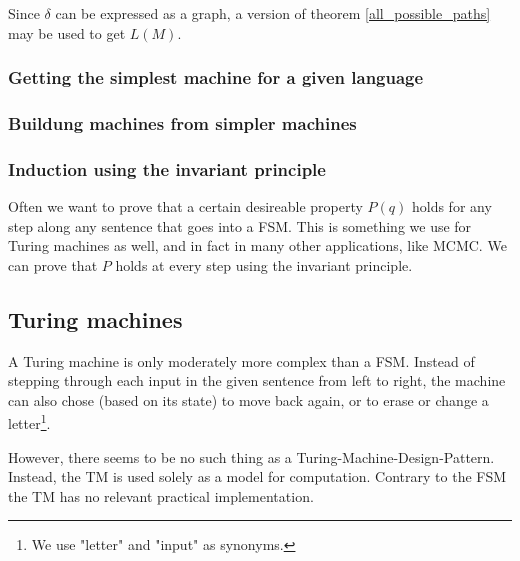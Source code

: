 Since $\delta$ can be expressed as a graph, a version of theorem \ref{all_possible_paths} may be used to get $L(M)$.

\subsubsection{Getting the simplest machine for a given language}

\subsubsection{Buildung machines from simpler machines}

\subsubsection{Induction using the invariant principle}
Often we want to prove that a certain desireable property $P(q)$ holds for any step along any sentence that goes into a FSM. This is something we use for Turing machines as well, and in fact in many other applications, like MCMC. We can prove that $P$ holds at every step using the invariant principle. 


\subsection{Turing machines}
A Turing machine is only moderately more complex than a FSM. Instead of stepping through each input in the given sentence from left to right, the machine can also chose (based on its state) to move back again, or to erase or change a letter\footnote{We use "letter" and "input" as synonyms.}.

However, there seems to be no such thing as a Turing-Machine-Design-Pattern. Instead, the TM is used solely as a model for computation. Contrary to the FSM the TM has no relevant practical implementation.